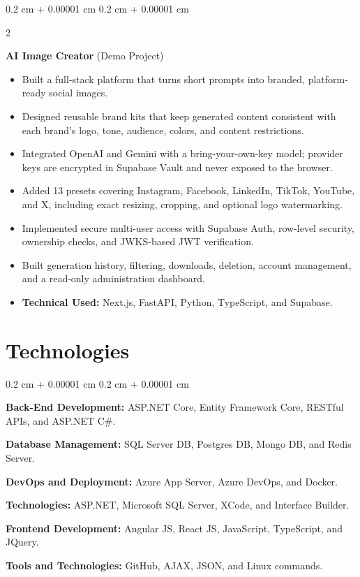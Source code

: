 \documentclass[10pt, letterpaper]{article}
\newenvironment{highlights}{
    \begin{itemize}[
        topsep=0.10 cm,
        parsep=0.10 cm,
        partopsep=0pt,
        itemsep=0pt,
        leftmargin=0.4 cm + 10pt
    ]
}{
    \end{itemize}
} %
\newenvironment{onecolentry}{
    \begin{adjustwidth}{
        0.2 cm + 0.00001 cm
    }{
        0.2 cm + 0.00001 cm
    }
}{
    \end{adjustwidth}
} %
\newenvironment{twocolentry}[2][]{
    \onecolentry
    \def\secondColumn{#2}
    \setcolumnwidth{\fill, 4.5 cm}
    \begin{paracol}{2}
}{
    \switchcolumn \raggedleft \secondColumn
    \end{paracol}
    \endonecolentry
} %
\let\hrefWithoutArrow\href
\renewcommand{\href}[2]{\hrefWithoutArrow{#1}{\ifthenelse{\equal{#2}{}}{ }{#2 }\raisebox{.15ex}{\footnotesize \faExternalLink*}}}
\begin{document}
        \vspace{1.0 cm}


        \begin{twocolentry}{
            \href{https://agency-bill-saas.vercel.app/}{AI Image Creator}
        }
            \textbf{AI Image Creator} (Demo Project) 
            \begin{highlights}
        \item {Built a full-stack platform that turns short prompts into branded, platform-ready social images.}
        \item {Designed reusable brand kits that keep generated content consistent with each brand’s logo, tone, audience, colors, and content restrictions.}
        \item {Integrated OpenAI and Gemini with a bring-your-own-key model; provider keys are encrypted in Supabase Vault and never exposed to the browser.}
        \item {Added 13 presets covering Instagram, Facebook, LinkedIn, TikTok, YouTube, and X, including exact resizing, cropping, and optional logo watermarking.}
        \item {Implemented secure multi-user access with Supabase Auth, row-level security, ownership checks, and JWKS-based JWT verification.}
        \item {Built generation history, filtering, downloads, deletion, account management, and a read-only administration dashboard.}
   
        \item {\textbf{Technical Used: } Next.js, FastAPI, Python, TypeScript, and Supabase.}            
        \end{highlights}
        \end{twocolentry}

        \vspace{1.0 cm}

    
    \section{Technologies}
        \begin{onecolentry}
            \item \textbf{Back-End Development:} ASP.NET Core, Entity Framework Core, RESTful APIs, and ASP.NET C\#.
            \item \textbf{Database Management:} SQL Server DB, Postgres DB,  Mongo DB, and Redis Server.
            \item \textbf{DevOps and Deployment:} Azure App Server, Azure DevOps, and Docker.
            \item \textbf{Technologies:} ASP.NET, Microsoft SQL Server, XCode, and Interface Builder.
            \item \textbf{Frontend Development:} Angular JS, React JS, JavaScript, TypeScript, and JQuery.
            \item \textbf{Tools and Technologies:} GitHub, AJAX, JSON, and Linux commands.
        \end{onecolentry}
\end{document}
